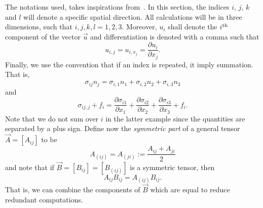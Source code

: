 The notations used, takes inspirations from~\cite{Cottrell2009iat}. In this section, the indices $i$, $j$, $k$ and $l$ will denote a specific spatial direction. All calculations will be in three dimensions, such that $i,j,k,l=1,2,3$. Moreover, $u_i$ shall denote the $i^{\textnormal{th}}$ component of the vector $\vec{u}$ and differentiation is denoted with a comma such that
\begin{equation*}
	u_{i,j} = u_{i,x_j} = \frac{\partial u_i}{\partial x_j}.
\end{equation*}
Finally, we use the convention that if an index is repeated, it imply summation. That is,
\begin{equation*}
	\sigma_{ij} n_j = \sigma_{i,1} n_1 + \sigma_{i,2} n_2 + \sigma_{i,3} n_3
\end{equation*}
and
\begin{equation*}
	\sigma_{ij,j} + f_i = \frac{\partial\sigma_{i1}}{\partial x_1} + \frac{\partial\sigma_{i2}}{\partial x_2} + \frac{\partial\sigma_{i3}}{\partial x_3} + f_i.
\end{equation*}
Note that we do not sum over $i$ in the latter example since the quantities are separated by a plus sign. Define now the \textit{symmetric part} of a general tensor $\vec{A}=[A_{ij}]$ to be
\begin{equation*}
	A_{(ij)} = A_{(ji)} := \frac{A_{ij}+A_{ji}}{2}
\end{equation*}
and note that if $\vec{B}=[B_{ij}] = [B_{(ij)}]$ is a symmetric tensor, then
\begin{equation}\label{Eq2:tensorSymmetry}
	A_{ij} B_{ij} = A_{(ij)} B_{ij}.
\end{equation}
That is, we can combine the components of $\vec{B}$ which are equal to reduce redundant computations.

